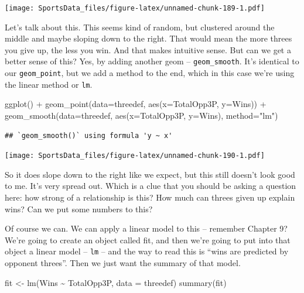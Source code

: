 \documentclass[
]{book}
\newenvironment{Shaded}{\begin{snugshade}}{\end{snugshade}}
\newcommand{\AttributeTok}[1]{\textcolor[rgb]{0.77,0.63,0.00}{#1}}
\newcommand{\FunctionTok}[1]{\textcolor[rgb]{0.00,0.00,0.00}{#1}}
\newcommand{\NormalTok}[1]{#1}
\newcommand{\OtherTok}[1]{\textcolor[rgb]{0.56,0.35,0.01}{#1}}
\newcommand{\SpecialCharTok}[1]{\textcolor[rgb]{0.00,0.00,0.00}{#1}}
\newcommand{\StringTok}[1]{\textcolor[rgb]{0.31,0.60,0.02}{#1}}
\begin{document}
\texttt{[image: SportsData\_files/figure-latex/unnamed-chunk-189-1.pdf]}

Let's talk about this. This seems kind of random, but clustered around the middle and maybe sloping down to the right. That would mean the more threes you give up, the less you win. And that makes intuitive sense. But can we get a better sense of this? Yes, by adding another geom -- \texttt{geom\_smooth}. It's identical to our \texttt{geom\_point}, but we add a method to the end, which in this case we're using the linear method or \texttt{lm}.

\begin{Shaded}
\begin{Highlighting}[]
\FunctionTok{ggplot}\NormalTok{() }\SpecialCharTok{+} 
  \FunctionTok{geom\_point}\NormalTok{(}\AttributeTok{data=}\NormalTok{threedef, }\FunctionTok{aes}\NormalTok{(}\AttributeTok{x=}\NormalTok{TotalOpp3P, }\AttributeTok{y=}\NormalTok{Wins)) }\SpecialCharTok{+}
  \FunctionTok{geom\_smooth}\NormalTok{(}\AttributeTok{data=}\NormalTok{threedef, }\FunctionTok{aes}\NormalTok{(}\AttributeTok{x=}\NormalTok{TotalOpp3P, }\AttributeTok{y=}\NormalTok{Wins), }\AttributeTok{method=}\StringTok{"lm"}\NormalTok{)}
\end{Highlighting}
\end{Shaded}

\begin{verbatim}
## `geom_smooth()` using formula 'y ~ x'
\end{verbatim}

\texttt{[image: SportsData\_files/figure-latex/unnamed-chunk-190-1.pdf]}

So it does slope down to the right like we expect, but this still doesn't look good to me. It's very spread out. Which is a clue that you should be asking a question here: how strong of a relationship is this? How much can threes given up explain wins? Can we put some numbers to this?

Of course we can. We can apply a linear model to this -- remember Chapter 9? We're going to create an object called fit, and then we're going to put into that object a linear model -- \texttt{lm} -- and the way to read this is ``wins are predicted by opponent threes''. Then we just want the summary of that model.

\begin{Shaded}
\begin{Highlighting}[]
\NormalTok{fit }\OtherTok{\textless{}{-}} \FunctionTok{lm}\NormalTok{(Wins }\SpecialCharTok{\textasciitilde{}}\NormalTok{ TotalOpp3P, }\AttributeTok{data =}\NormalTok{ threedef)}
\FunctionTok{summary}\NormalTok{(fit)}
\end{Highlighting}
\end{Shaded}
\end{document}
